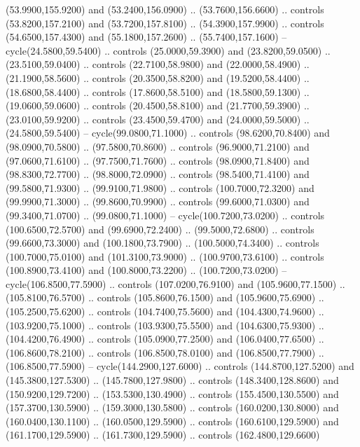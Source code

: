 {\begin{scope}[y=0.80pt, x=0.80pt, yscale=-1, xscale=1, inner sep=0pt, outer sep=0pt, #1]
      (53.9900,155.9200) and (53.2400,156.0900) .. (53.7600,156.6600) .. controls
      (53.8200,157.2100) and (53.7200,157.8100) .. (54.3900,157.9900) .. controls
      (54.6500,157.4300) and (55.1800,157.2600) .. (55.7400,157.1600) --
      cycle(24.5800,59.5400) .. controls (25.0000,59.3900) and (23.8200,59.0500) ..
      (23.5100,59.0400) .. controls (22.7100,58.9800) and (22.0000,58.4900) ..
      (21.1900,58.5600) .. controls (20.3500,58.8200) and (19.5200,58.4400) ..
      (18.6800,58.4400) .. controls (17.8600,58.5100) and (18.5800,59.1300) ..
      (19.0600,59.0600) .. controls (20.4500,58.8100) and (21.7700,59.3900) ..
      (23.0100,59.9200) .. controls (23.4500,59.4700) and (24.0000,59.5000) ..
      (24.5800,59.5400) -- cycle(99.0800,71.1000) .. controls (98.6200,70.8400) and
      (98.0900,70.5800) .. (97.5800,70.8600) .. controls (96.9000,71.2100) and
      (97.0600,71.6100) .. (97.7500,71.7600) .. controls (98.0900,71.8400) and
      (98.8300,72.7700) .. (98.8000,72.0900) .. controls (98.5400,71.4100) and
      (99.5800,71.9300) .. (99.9100,71.9800) .. controls (100.7000,72.3200) and
      (99.9900,71.3000) .. (99.8600,70.9900) .. controls (99.6000,71.0300) and
      (99.3400,71.0700) .. (99.0800,71.1000) -- cycle(100.7200,73.0200) .. controls
      (100.6500,72.5700) and (99.6900,72.2400) .. (99.5000,72.6800) .. controls
      (99.6600,73.3000) and (100.1800,73.7900) .. (100.5000,74.3400) .. controls
      (100.7000,75.0100) and (101.3100,73.9000) .. (100.9700,73.6100) .. controls
      (100.8900,73.4100) and (100.8000,73.2200) .. (100.7200,73.0200) --
      cycle(106.8500,77.5900) .. controls (107.0200,76.9100) and (105.9600,77.1500)
      .. (105.8100,76.5700) .. controls (105.8600,76.1500) and (105.9600,75.6900) ..
      (105.2500,75.6200) .. controls (104.7400,75.5600) and (104.4300,74.9600) ..
      (103.9200,75.1000) .. controls (103.9300,75.5500) and (104.6300,75.9300) ..
      (104.4200,76.4900) .. controls (105.0900,77.2500) and (106.0400,77.6500) ..
      (106.8600,78.2100) .. controls (106.8500,78.0100) and (106.8500,77.7900) ..
      (106.8500,77.5900) -- cycle(144.2900,127.6000) .. controls (144.8700,127.5200)
      and (145.3800,127.5300) .. (145.7800,127.9800) .. controls (148.3400,128.8600)
      and (150.9200,129.7200) .. (153.5300,130.4900) .. controls (155.4500,130.5500)
      and (157.3700,130.5900) .. (159.3000,130.5800) .. controls (160.0200,130.8000)
      and (160.0400,130.1100) .. (160.0500,129.5900) .. controls (160.6100,129.5900)
      and (161.1700,129.5900) .. (161.7300,129.5900) .. controls (162.4800,129.6600)

\end{scope}}
